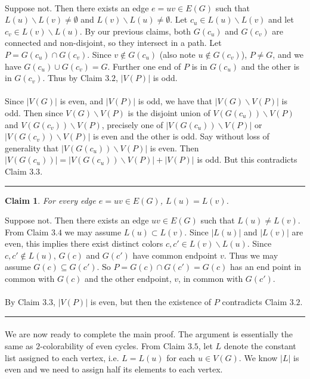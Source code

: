 \documentclass[letterpaper,12pt,oneside,onecolumn]{article}
\newenvironment{proof}{{\bf Proof:  }}{\hfill\rule{2mm}{2mm}}
\newtheorem{claim}[fact]{Claim}
\begin{document}
\begin{proof}
	\paragraph{}
	Suppose not. Then there exists an edge $e=uv \in E(G)$ such that $L(u)\backslash L(v) \neq \emptyset$ and $L(v)\backslash L(u) \neq \emptyset$. Let $c_u \in L(u) \backslash L(v)$ and let $c_v \in L(v)\backslash L(u)$. By our previous claims, both $G(c_u)$ and $G(c_v)$ are connected and non-disjoint, so they intersect in a path. Let $P = G(c_u) \cap G(c_v)$. Since $v \not\in G(c_u)$ (also note $u \not\in G(c_v)$), $P \neq G$, and we have $G(c_u) \cup G(c_v) = G$. Further one end of $P$ is in $G(c_u)$ and the other is in $G(c_v)$. Thus by Claim $3.2$, $|V(P)|$ is odd.
	\paragraph{}
	Since $|V(G)|$ is even,  and $|V(P)|$ is odd, we have that $|V(G) \backslash V(P)|$ is odd. Then since $V(G)\backslash V(P)$ is the disjoint union of $V(G(c_u))\backslash V(P)$ and $V(G(c_v)) \backslash V(P)$, precisely one of $|V(G(c_u))\backslash V(P)|$ or $|V(G(c_v))\backslash V(P)|$ is even and the other is odd. Say without loss of generality that $|V(G(c_u))\backslash V(P)|$ is even. Then $|V(G(c_u))| = |V(G(c_u))\backslash V(P)| + |V(P)|$ is odd. But this contradicts Claim $3.3$.
	\end{proof}
\begin{claim}
For every edge $e=uv \in E(G)$, $L(u) = L(v)$.
\end{claim}
\begin{proof}
	Suppose not. Then there exists an edge $uv \in E(G)$ such that $L(u) \neq L(v)$. From Claim $3.4$ we may assume $L(u) \subset L(v)$. Since $|L(u)|$ and $|L(v)|$ are even, this implies there exist distinct colors $c, c' \in L(v)\backslash L(u)$. Since $c, c' \not\in L(u)$, $G(c)$ and $G(c')$ have common endpoint $v$. Thus we may assume $G(c) \subseteq G(c')$. So $P = G(c) \cap G(c') = G(c)$ has an end point in common with $G(c)$ and the other endpoint, $v$, in common with $G(c')$.
	\paragraph{}
	By Claim $3.3$, $|V(P)|$ is even, but then the existence of $P$ contradicts Claim $3.2$.
\end{proof}
\paragraph{}
We are now ready to complete the main proof. The argument is essentially the same as $2$-colorability of even cycles. From Claim $3.5$, let $L$ denote the constant list assigned to each vertex, i.e. $L = L(u)$ for each $u \in V(G)$. We know $|L|$ is even and we need to assign half its elements to each vertex.
\end{document}
